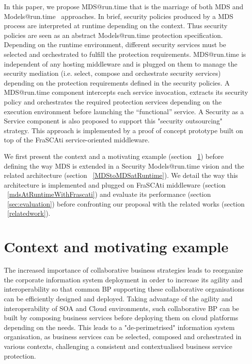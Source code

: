 \documentclass[runningheads,a4paper]{llncs}
\begin{document}
In this paper, we propose MDS@run.time that is the marriage of both MDS and Models@run.time~\cite{blair2009models} approaches.
In brief, security policies produced by a MDS process are interpreted at runtime depending on the context.
Thus security policies are seen as an abstract Models@run.time protection specification.
Depending on the runtime environment, different security services must be selected and orchestrated to fulfill the protection requirements.
MDS@run.time is independent of any hosting middleware and
is plugged on them to manage the security mediation (i.e. select, compose and orchestrate security services) depending on the protection requirements defined in the security policies.
A MDS@run.time component intercepts each service invocation, extracts its security policy and orchestrates the required protection services depending on the execution environment before launching the “functional” service.
A Security as a Service component is also proposed to support this "security outsourcing" strategy. 
This approach is implemented by a proof of concept prototype built on top of the FraSCAti service-oriented middleware.


We first present the context and a motivating example (section ~\ref{contextAndMotivation})  before defining the way MDS is extended in a Security Models@run.time vision and the related architecture (section ~\ref{MDStoMDSatRuntime}). We detail the way this architecture is implemented and plugged on FraSCAti middleware (section ~\ref{mdsAtRuntimeWithFrascati}) and evaluate its performance (section ~\ref{sec:evaluation}) before confronting our proposal with the related works (section ~\ref{relatedwork}).

\section{Context and motivating example}
\label{contextAndMotivation}

The increased importance of collaborative business strategies leads to reorganize the corporate information system deployment in order to increase its agility and interoperability so that common BP supporting these collaborative organisations can be efficiently designed and deployed. Taking advantage of the agility and interoperability of SOA and Cloud environments, such collaborative BP can be built by composing business services before deploying them on cloud platforms depending on the needs. This leads to a "de-perimetrised" information system organisation, as business services can be selected, composed and orchestrated in various contexts, challenging a consistent and contextualised business service protection.
\end{document}
